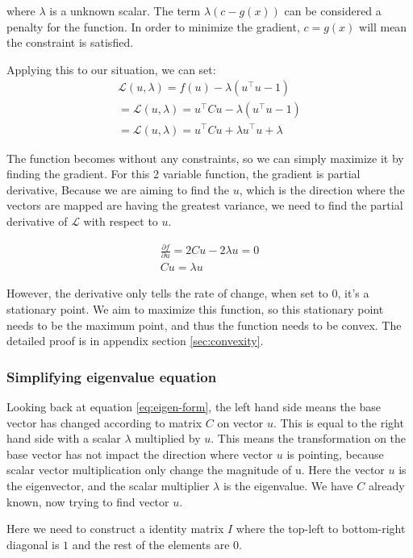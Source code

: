 \documentclass[stu,12pt,floatsintext]{apa7}
\begin{document}
where $\lambda$ is a unknown scalar. The term $\lambda(c-g(x))$ can be considered a penalty for the function. In order to minimize the gradient, $c=g(x)$ will mean the constraint is satisfied.

Applying this to our situation, we can set:
\begin{gather}  
    \mathcal{L}(u, \lambda) = f(u) - \lambda(u^\top u-1)\\
    =\mathcal{L}(u, \lambda) = u^\top Cu - \lambda(u^\top u-1)\\
    =\mathcal{L}(u,\lambda)=u^\top Cu+\lambda u^\top u+\lambda
\end{gather}

The function becomes without any constraints, so we can simply maximize it by finding the gradient. For this 2 variable function, the gradient is partial derivative, Because we are aiming to find the $u$, which is the direction where the vectors are mapped are having the greatest variance, we need to find the partial derivative of $\mathcal{L}$ with respect to $u$.

\begin{gather}
    \label{eq:first-partial}
    \frac{\partial f}{\partial u}=2Cu-2\lambda u=0\\
    \label{eq:eigen-form}
    Cu=\lambda u
\end{gather}

However, the derivative only tells the rate of change, when set to $0$, it's a stationary point. We aim to maximize this function, so this stationary point needs to be the maximum point, and thus the function needs to be convex. The detailed proof is in appendix section \ref{sec:convexity}.


\subsubsection{Simplifying eigenvalue equation}
\label{sec:simplifying-eigenvalue-eq}
Looking back at equation \ref{eq:eigen-form}, the left hand side means the base vector has changed according to matrix $C$ on vector $u$. This is equal to the right hand side with a scalar $\lambda$ multiplied by $u$. This means the transformation on the base vector has not impact the direction where vector $u$ is pointing, because scalar vector multiplication only change the magnitude of u. Here the vector $u$ is the eigenvector, and the scalar multiplier $\lambda$ is the eigenvalue. We have $C$ already known, now trying to find vector $u$. 

Here we need to construct a identity matrix $I$ where the top-left to bottom-right diagonal is $1$ and the rest of the elements are $0$.
\end{document}
